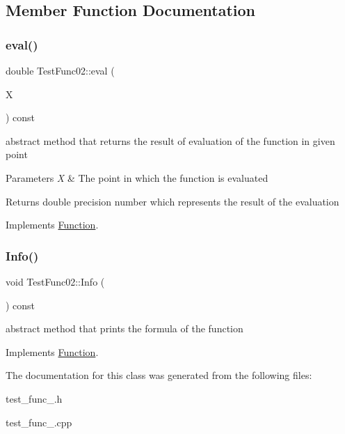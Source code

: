 \subsection{Member Function Documentation}
\mbox{\label{class_test_func02_af4cbebcbe8a7bd282f48ae7053c044b0}} 
\subsubsection{\texorpdfstring{eval()}{eval()}}
{\footnotesize\ttfamily double Test\+Func02\+::eval (\begin{DoxyParamCaption}\item[{const \hyperlink{classv_point}{v\+Point} \&}]{X }\end{DoxyParamCaption}) const\hspace{0.3cm}{\ttfamily [virtual]}}

abstract method that returns the result of evaluation of the function in given point 
\begin{DoxyParams}{Parameters}
{\em X} & The point in which the function is evaluated \\
\hline
\end{DoxyParams}
\begin{DoxyReturn}{Returns}
double precision number which represents the result of the evaluation 
\end{DoxyReturn}


Implements \hyperlink{class_function_a8b9d55271a531b6f5bef09bfae0a23d9}{Function}.

\mbox{\label{class_test_func02_abb39a10959e945371e662db3cd9d86ce}} 
\subsubsection{\texorpdfstring{Info()}{Info()}}
{\footnotesize\ttfamily void Test\+Func02\+::\+Info (\begin{DoxyParamCaption}{ }\end{DoxyParamCaption}) const\hspace{0.3cm}{\ttfamily [virtual]}}

abstract method that prints the formula of the function 

Implements \hyperlink{class_function_a6915be18a065224ed73b1288c6125948}{Function}.



The documentation for this class was generated from the following files\+:\begin{DoxyCompactItemize}
\item 
test\+\_\+func\+\_.\+h\item 
test\+\_\+func\+\_.\+cpp\end{DoxyCompactItemize}
